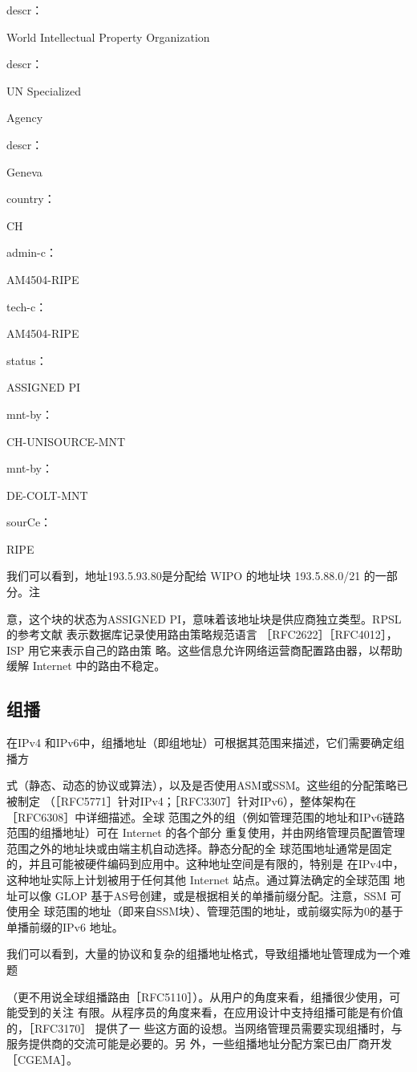descr：

World Intellectual Property Organization

descr：

UN Specialized

Agency

descr：

Geneva

country：

CH

admin-c：

AM4504-RIPE

tech-c：

AM4504-RIPE

status：

ASSIGNED PI

mnt-by：

CH-UNISOURCE-MNT

mnt-by：

DE-COLT-MNT

sourCe：

RIPE

我们可以看到，地址193.5.93.80是分配给 WIPO 的地址块 193.5.88.0/21 的一部分。注

意，这个块的状态为ASSIGNED PI，意味着该地址块是供应商独立类型。RPSL 的参考文献
表示数据库记录使用路由策略规范语言 ［RFC2622］［RFC4012］，ISP 用它来表示自己的路由策
略。这些信息允许网络运营商配置路由器，以帮助缓解 Internet 中的路由不稳定。

\subsection{组播}
在IPv4 和IPv6中，组播地址（即组地址）可根据其范围来描述，它们需要确定组播方

式（静态、动态的协议或算法），以及是否使用ASM或SSM。这些组的分配策略已被制定
（［RFC5771］针对IPv4；［RFC3307］针对IPv6），整体架构在［RFC6308］中详细描述。全球
范围之外的组（例如管理范围的地址和IPv6链路范围的组播地址）可在 Internet 的各个部分
重复使用，并由网络管理员配置管理范围之外的地址块或由端主机自动选择。静态分配的全
球范围地址通常是固定的，并且可能被硬件编码到应用中。这种地址空间是有限的，特别是
在IPv4中，这种地址实际上计划被用于任何其他 Internet 站点。通过算法确定的全球范围
地址可以像 GLOP 基于AS号创建，或是根据相关的单播前缀分配。注意，SSM 可使用全
球范围的地址（即来自SSM块）、管理范围的地址，或前缀实际为0的基于单播前缀的IPv6
地址。

我们可以看到，大量的协议和复杂的组播地址格式，导致组播地址管理成为一个难题

（更不用说全球组播路由［RFC5110］）。从用户的角度来看，组播很少使用，可能受到的关注
有限。从程序员的角度来看，在应用设计中支持组播可能是有价值的，［RFC3170］ 提供了一
些这方面的设想。当网络管理员需要实现组播时，与服务提供商的交流可能是必要的。另
外，一些组播地址分配方案已由厂商开发［CGEMA］。


